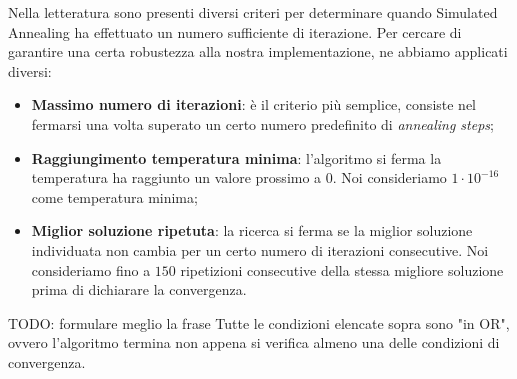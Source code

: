 \noindent Nella letteratura sono presenti diversi criteri per determinare quando Simulated Annealing ha effettuato un numero sufficiente di iterazione. Per cercare di garantire una certa robustezza alla nostra implementazione, ne abbiamo applicati diversi:

\begin{itemize}
    \item \textbf{Massimo numero di iterazioni}: è il criterio più semplice, consiste nel fermarsi una volta superato un certo numero predefinito di \textit{annealing steps};
    \item \textbf{Raggiungimento temperatura minima}: l'algoritmo si ferma la temperatura ha raggiunto un valore prossimo a 0. Noi consideriamo $1 \cdot 10^{-16}$ come temperatura minima;
    \item \textbf{Miglior soluzione ripetuta}: la ricerca si ferma se la miglior soluzione individuata non cambia per un certo numero di iterazioni consecutive. Noi consideriamo fino a $150$ ripetizioni consecutive della stessa migliore soluzione prima di dichiarare la convergenza.
\end{itemize}

TODO: formulare meglio la frase
\noindent Tutte le condizioni elencate sopra sono "in OR", ovvero l'algoritmo termina non appena si verifica almeno una delle condizioni di convergenza.

